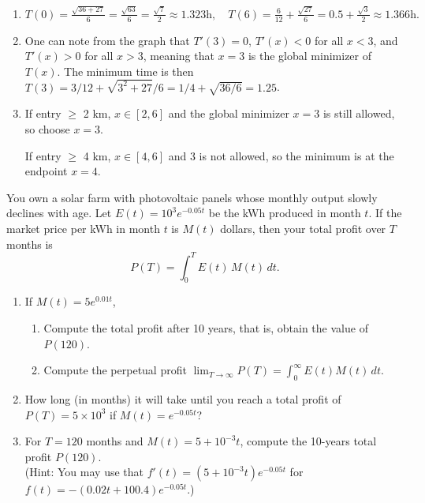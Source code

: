 \documentclass[11pt]{exam}
\begin{document}
\begin{questions}
\begin{solution}
\begin{enumerate}[label=(\alph*)]
  \item 
  $
    T(0)
    = \frac{\sqrt{36 + 27}}{6}
    = \frac{\sqrt{63}}{6}
    = \frac{\sqrt7}{2}
    \approx1.323\text{h},
  \quad 
    T(6)
    = \frac{6}{12} + \frac{\sqrt{27}}{6}
    = 0.5 + \frac{\sqrt3}{2}
    \approx1.366\text{h}.
  $
  \item One can note from the graph that $T'(3) = 0$, $T'(x) < 0$ for all $x < 3$, and $T'(x) > 0$ for all $x > 3$, meaning that $x = 3$ is the global minimizer of $T(x)$. The minimum time is then $T(3) = 3/12 + \sqrt{3^2+27}/6 = 1/4 + \sqrt{36/6} = 1.25$.
  \item  If entry $\geq$ 2 km, \(x\in[2,6]\) and the global minimizer \(x=3\) is still allowed, so choose \(x=3\).  
  
  If entry $\geq$ 4 km, \(x\in[4,6]\) and \(3\) is not allowed, so the minimum is at the endpoint \(x=4\).
\end{enumerate}
\end{solution}

\question[2.5]
You own a solar farm with photovoltaic panels whose monthly output slowly declines with age. Let
\(E(t)=10^3e^{-0.05t}\) be the kWh produced in month \(t\). If the market price per kWh in month \(t\) is \(M(t)\) dollars, then your total profit over \(T\) months is
\[
P(T)=\int_{0}^{T}E(t)\,M(t)\,dt.
\]

\begin{enumerate}[leftmargin=0.5cm,label=(\alph*)]
  \item If $M(t)=5e^{0.01t}$,  
    \begin{enumerate}[leftmargin=0.5cm,label=(\roman*)]
      \item Compute the total profit after 10 years, that is, obtain the value of $P(120)$.  
      \item Compute the perpetual profit $\lim_{T\to\infty}P(T) = \int_0^\infty E(t)M(t)\,dt$.
    \end{enumerate}
  \item How long (in months) it will take until you reach a total profit of $P(T) = 5\times10^3$ if $M(t)=e^{-0.05t}$?
  \item For $T=120$ months and $M(t)=5+10^{-3}t$, compute the 10-years total profit $P(120)$. \\
  (Hint: You may use that $f'(t) = (5+10^{-3}t)e^{-0.05t}$ for $f(t) = -(0.02t+100.4)e^{-0.05t}$.)
\end{enumerate}


\end{questions}
\end{document}
